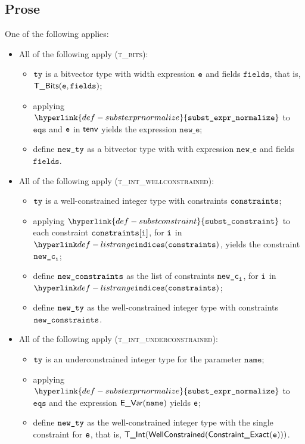 \documentclass{book}
\newcommand\substexprnormalize[0]{\hyperlink{def-substexprnormalize}{\texttt{subst\_expr\_normalize}}}
\newcommand\substconstraint[0]{\hyperlink{def-substconstraint}{\texttt{subst\_constraint}}}
\newcommand\eqs[0]{\texttt{eqs}}
\newcommand\fields[0]{\texttt{fields}}
\newcommand\newe[0]{\texttt{new\_e}}
\newcommand\name[0]{\texttt{name}}
\begin{document}
\subsection{Prose}
One of the following applies:
\begin{itemize}
  \item All of the following apply (\textsc{t\_bits}):
  \begin{itemize}
    \item $\texttt{ty}$ is a bitvector type with width expression $\texttt{e}$ and fields $\fields$, that is, $\TBits(\ve, \fields)$;
    \item applying $\substexprnormalize$ to $\eqs$ and $\texttt{e}$ in $\textsf{tenv}$ yields the expression $\newe$;
    \item define $\texttt{new\_ty}$ as a bitvector type with with expression $\newe$ and fields $\fields$.
  \end{itemize}

  \item All of the following apply (\textsc{t\_int\_wellconstrained}):
  \begin{itemize}
    \item $\texttt{ty}$ is a well-constrained integer type with constraints $\texttt{constraints}$;
    \item applying $\substconstraint$ to each constraint $\texttt{constraints}[\texttt{i}]$, for $\texttt{i}$ in \\
          $\listrange(\constraints)$, yields the constraint $\texttt{new\_c}_{\texttt{i}}$;
    \item define $\texttt{new\_constraints}$ as the list of constraints $\texttt{new\_c}_{\texttt{i}}$, for $\texttt{i}$ in \\
          $\listrange(\constraints)$;
    \item define $\texttt{new\_ty}$ as the well-constrained integer type with constraints \\
          $\texttt{new\_constraints}$.
  \end{itemize}

  \item All of the following apply (\textsc{t\_int\_underconstrained}):
  \begin{itemize}
    \item $\texttt{ty}$ is an underconstrained integer type for the parameter $\name$;
    \item applying $\substexprnormalize$ to $\eqs$ and the expression $\EVar(\name)$ yields $\texttt{e}$;
    \item define $\texttt{new\_ty}$ as the well-constrained integer type with the single constraint for $\texttt{e}$, that is,
          $\textsf{T\_Int}(\textsf{WellConstrained}(\textsf{Constraint\_Exact}(\texttt{e})))$.
  \end{itemize}


\end{itemize}
\end{document}
